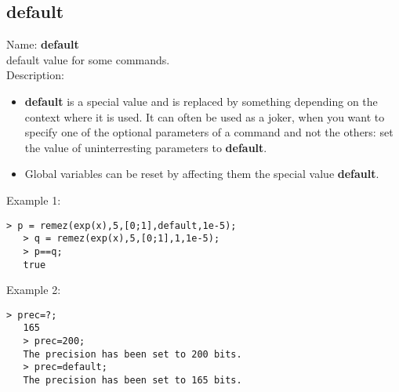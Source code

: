 \subsection{ default }
\noindent Name: \textbf{default}\\
default value for some commands.\\

\noindent Description: \begin{itemize}

\item \textbf{default} is a special value and is replaced by something depending on the 
   context where it is used. It can often be used as a joker, when you want to 
   specify one of the optional parameters of a command and not the others: set 
   the value of uninterresting parameters to \textbf{default}.

\item Global variables can be reset by affecting them the special value \textbf{default}.
\end{itemize}
\noindent Example 1: 
\begin{center}\begin{minipage}{14.8cm}\begin{Verbatim}[frame=single]
   > p = remez(exp(x),5,[0;1],default,1e-5);
   > q = remez(exp(x),5,[0;1],1,1e-5);
   > p==q;
   true
\end{Verbatim}
\end{minipage}\end{center}
\noindent Example 2: 
\begin{center}\begin{minipage}{14.8cm}\begin{Verbatim}[frame=single]
   > prec=?;
   165
   > prec=200;
   The precision has been set to 200 bits.
   > prec=default;
   The precision has been set to 165 bits.
\end{Verbatim}
\end{minipage}\end{center}
